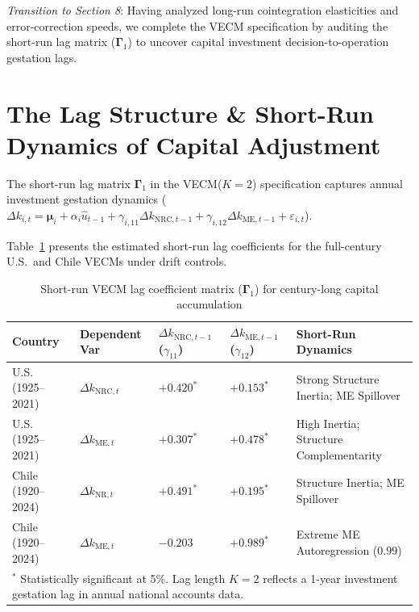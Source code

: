 \documentclass[11pt,a4paper]{article}
\begin{document}
\textit{Transition to Section 8}: Having analyzed long-run cointegration elasticities and error-correction speeds, we complete the VECM specification by auditing the short-run lag matrix ($\boldsymbol{\Gamma}_1$) to uncover capital investment decision-to-operation gestation lags.

\FloatBarrier
\section{The Lag Structure \& Short-Run Dynamics of Capital Adjustment}

The short-run lag matrix $\boldsymbol{\Gamma}_1$ in the VECM($K=2$) specification captures annual investment gestation dynamics ($\Delta k_{i,t} = \boldsymbol{\mu}_i + \alpha_i \hat{u}_{t-1} + \gamma_{i,11} \Delta k_{\text{NRC},t-1} + \gamma_{i,12} \Delta k_{\text{ME},t-1} + \varepsilon_{i,t}$).

Table~\ref{tab:vecm_gamma_table} presents the estimated short-run lag coefficients for the full-century U.S.\ and Chile VECMs under drift controls.

\begin{table}[h!]
\centering
\small
\caption{Short-run VECM lag coefficient matrix ($\boldsymbol{\Gamma}_1$) for century-long capital accumulation}
\label{tab:vecm_gamma_table}
\begin{tabular}{p{2.0cm} p{2.8cm} p{2.4cm} p{2.4cm} p{3.2cm}}
\toprule
\textbf{Country} & \textbf{Dependent Var} & \textbf{$\Delta k_{\text{NRC}, t-1}$ ($\gamma_{11}$)} & \textbf{$\Delta k_{\text{ME}, t-1}$ ($\gamma_{12}$)} & \textbf{Short-Run Dynamics} \\
\midrule
U.S. (1925--2021) & $\Delta k_{\text{NRC}, t}$ & $+0.420^*$ & $+0.153^*$ & Strong Structure Inertia; ME Spillover \\
U.S. (1925--2021) & $\Delta k_{\text{ME}, t}$ & $+0.307^*$ & $+0.478^*$ & High Inertia; Structure Complementarity \\
\midrule
Chile (1920--2024) & $\Delta k_{\text{NR}, t}$ & $+0.491^*$ & $+0.195^*$ & Structure Inertia; ME Spillover \\
Chile (1920--2024) & $\Delta k_{\text{ME}, t}$ & $-0.203$ & $+0.989^*$ & Extreme ME Autoregression ($0.99$) \\
\bottomrule
\multicolumn{5}{p{13.8cm}}{\footnotesize $^*$ Statistically significant at 5\%. Lag length $K=2$ reflects a 1-year investment gestation lag in annual national accounts data.}
\end{tabular}
\end{table}
\end{document}
